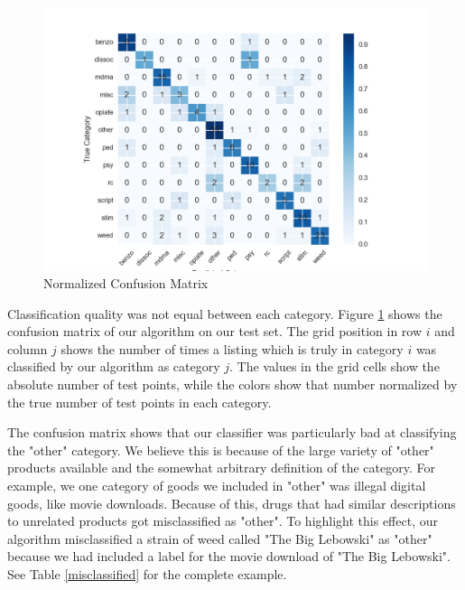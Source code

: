 \begin{figure}[htbp]
    \includegraphics[width=\linewidth]{plots/confusion_matrix}
    \caption{Normalized Confusion Matrix}
    \label{confusion_matrix}
\end{figure}

Classification quality was not equal between each category. Figure \ref{confusion_matrix} shows the
confusion matrix of our algorithm on our test set. The grid position in row $i$ and column $j$ shows
the number of times a listing which is truly in category $i$ was classified by our algorithm as
category $j$. The values in the grid cells show the absolute number of test points, while the colors
show that number normalized by the true number of test points in each category.

The confusion matrix shows that our classifier was particularly bad at classifying the "other"
category.
We believe this is because of the large variety of "other" products available and the somewhat
arbitrary definition of the category. 
For example, we one category of goods we included in "other" was illegal digital goods, like movie downloads.
Because of this, drugs that had similar descriptions to unrelated products got misclassified as
"other".
To highlight this effect, our algorithm misclassified a strain of weed called "The Big Lebowski" as "other" because we had included a label for the movie download of "The Big Lebowski". See Table \ref{misclassified} for the complete example.




